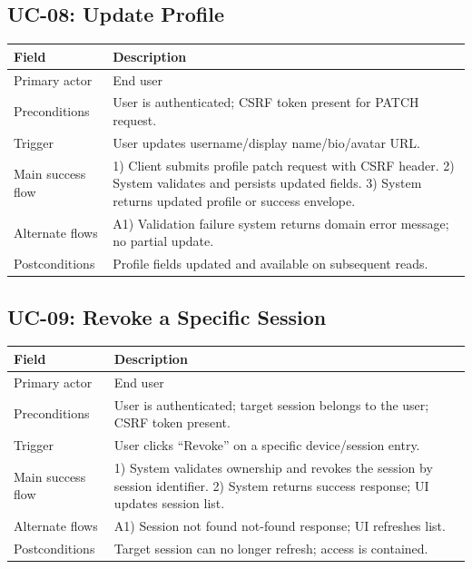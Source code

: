 \documentclass[11pt]{article}
\begin{document}
    \subsection{UC-08: Update Profile}
    \begin{tabularx}{\textwidth}{@{}lX@{}}
\toprule
\textbf{Field} & \textbf{Description} \\
\midrule
Primary actor & End user \\
Preconditions & User is authenticated; CSRF token present for PATCH request. \\
Trigger & User updates username/display name/bio/avatar URL. \\
Main success flow &
1) Client submits profile patch request with CSRF header. 2) System validates and persists updated fields. 3) System returns updated profile or success envelope. \\
Alternate flows & A1) Validation failure \textrightarrow{} system returns domain error message; no partial update. \\
Postconditions & Profile fields updated and available on subsequent reads. \\
\bottomrule
    \end{tabularx}

    \subsection{UC-09: Revoke a Specific Session}
    \begin{tabularx}{\textwidth}{@{}lX@{}}
\toprule
\textbf{Field} & \textbf{Description} \\
\midrule
Primary actor & End user \\
Preconditions & User is authenticated; target session belongs to the user; CSRF token present. \\
Trigger & User clicks ``Revoke'' on a specific device/session entry. \\
Main success flow &
1) System validates ownership and revokes the session by session identifier. 2) System returns success response; UI updates session list. \\
Alternate flows & A1) Session not found \textrightarrow{} not-found response; UI refreshes list. \\
Postconditions & Target session can no longer refresh; access is contained. \\
\bottomrule
    \end{tabularx}

\end{document}
